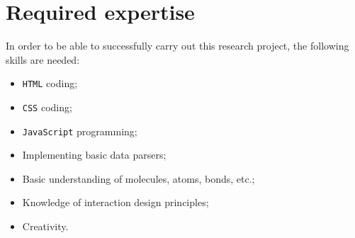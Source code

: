 \chapter{Required expertise}

In order to be able to successfully carry out this research project, the following skills are needed:
\begin{itemize}
\item \verb|HTML| coding;
\item \verb|CSS| coding;
\item \verb|JavaScript| programming;
\item Implementing basic data parsers;
\item Basic understanding of molecules, atoms, bonds, etc.;
\item Knowledge of interaction design principles;
\item Creativity.
\end{itemize}

